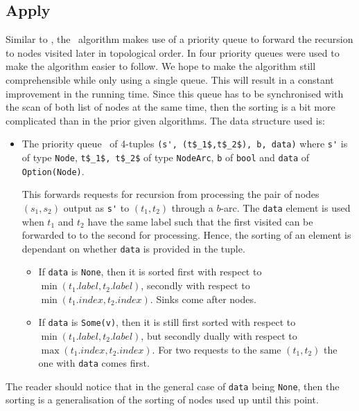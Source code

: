 \subsection{Apply}
Similar to \Restrict, the \Apply\ algorithm makes use of a priority queue to
forward the recursion to nodes visited later in topological order. In
\cite{Arge96} four priority queues were used to make the algorithm easier to
follow. We hope to make the algorithm still comprehensible while only using a
single queue. This will result in a constant improvement in the running time.
Since this queue has to be synchronised with the scan of both list of nodes at
the same time, then the sorting is a bit more complicated than in the prior
given algorithms. The data structure used is:
\begin{itemize}
\item The priority queue \ApplyQrec\ of 4-tuples \lstinline{(s', (t$_1$,t$_2$), b, data)}
  where \lstinline{s'} is of type \lstinline{Node}, \lstinline{t$_1$, t$_2$} of
  type \lstinline{NodeArc}, \lstinline{b} of \lstinline{bool} and
  \lstinline{data} of \lstinline{Option(Node)}.

  This forwards requests for recursion from processing the pair of nodes $(s_1,
  s_2)$ output as \lstinline{s'} to $(t_1,t_2)$ through a $b$-arc. The
  \lstinline{data} element is used when $t_1$ and $t_2$ have the same label such
  that the first visited can be forwarded to to the second for processing.
  Hence, the sorting of an element is dependant on whether \lstinline{data} is
  provided in the tuple.

  \begin{itemize}
  \item If \lstinline{data} is \lstinline{None}, then it is sorted first with
    respect to $\min(t_1.\mathit{label},t_2.\mathit{label})$, secondly with
    respect to $\min(t_1.\mathit{index},t_2.\mathit{index})$. Sinks come after
    nodes.

  \item If \lstinline{data} is \lstinline{Some(v)}, then it is still first
    sorted with respect to $\min(t_1.\mathit{label},t_2.\mathit{label})$, but
    secondly dually with respect to $\max(t_1.\mathit{index},
    t_2.\mathit{index})$. For two requests to the same $(t_1,t_2)$ the one with
    \lstinline{data} comes first.
  \end{itemize}
\end{itemize}
The reader should notice that in the general case of \lstinline{data} being
\lstinline{None}, then the sorting is a generalisation of the sorting of nodes
used up until this point.

